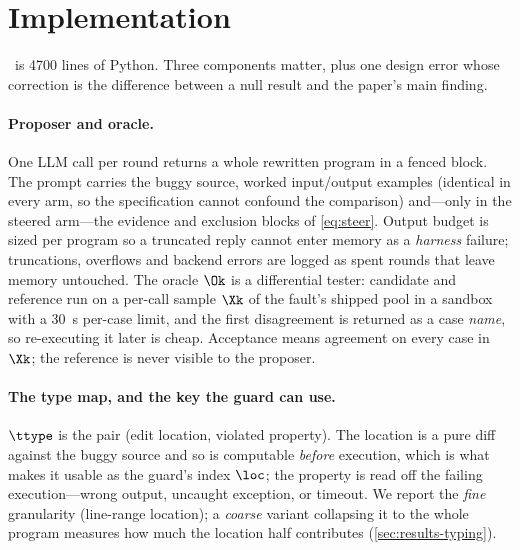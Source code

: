 \section{Implementation}
\label{sec:impl}

\CEGMem\ is \num{4700} lines of Python. Three components matter, plus one
design error whose correction is the difference between a null result and the
paper's main finding.

\paragraph{Proposer and oracle.}
One LLM call per round returns a whole rewritten program in a fenced block. The
prompt carries the buggy source, worked input/output examples (identical in
every arm, so the specification cannot confound the comparison) and---only in
the steered arm---the evidence and exclusion blocks of \cref{eq:steer}. Output
budget is sized per program so a truncated reply cannot enter memory as a
\emph{harness} failure; truncations, overflows and backend errors are logged as
spent rounds that leave memory untouched. The oracle $\Ok$ is a differential
tester: candidate and reference run on a per-call sample $\Xk$ of the fault's
shipped pool in a sandbox with a \SI{30}{\second} per-case limit, and the first
disagreement is returned as a case \emph{name}, so re-executing it later is
cheap. Acceptance means agreement on every case in $\Xk$; the reference is
never visible to the proposer.

\paragraph{The type map, and the key the guard can use.}
$\ttype$ is the pair (edit location, violated property). The location is a pure
diff against the buggy source and so is computable \emph{before} execution,
which is what makes it usable as the guard's index $\loc$; the property is read
off the failing execution---wrong output, uncaught exception, or timeout. We
report the \emph{fine} granularity (line-range location); a \emph{coarse}
variant collapsing it to the whole program measures how much the location half
contributes (\cref{sec:results-typing}).

